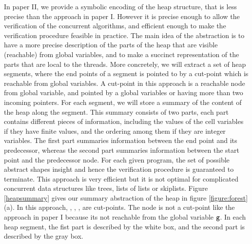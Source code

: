 In paper II, we provide a symbolic encoding of the heap structure, that is less precise than the approach in paper I. However it is precise enough to allow the verification of the concurrent algorithms, and efficient enough to make the verification procedure feasible in practice. 
The main idea of the abstraction is to have a more precise description of the parts of the heap that are visible (reachable) from global variables, and to make a succinct representation of the parts that are local to the threads. More concretely, we will extract a set of heap segments, where the end points of a segment is pointed to by a cut-point which is reachable from global variables. A cut-point in this approach is a reachable node from global variable, and pointed by a global variables or having more than two incoming pointers. For each segment, we will store a summary of the content of the heap along the segment. This summary consists of two parts, each part contains different pieces of information, including the values of the cell variables if they have finite values, and the ordering among them if they are integer variables. The first part summaries information between the end point and its predecessor, whereas the second part summaries information between the start point and the predecessor node.  For each given program, the set of possible abstract shapes insight  and hence the verification procedure is guaranteed to terminate.
 This approach is very efficient but it is not optimal for complicated concurrent data structures like trees, lists of lists or skiplists. Figure \ref{heapsummary} gives our summary abstraction of the heap in figure \ref{figure:forest}(a). In this approach, \nodea, \nodeb, \nodec, \nodee \; are cut-points. The node \noded \; is not a cut-point like the approach in paper I because its not reachable from the global variable $\tt g$. In each heap segment, the fist part is described by the white box, and the second part is described by the gray box.   
